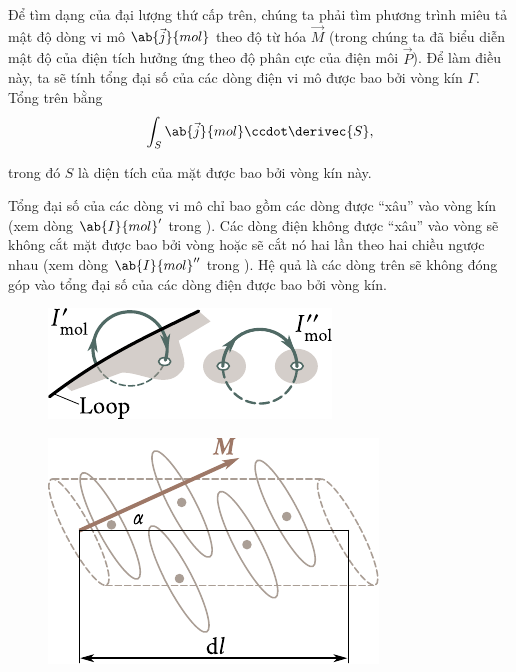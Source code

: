 Để tìm dạng của đại lượng thứ cấp trên, chúng ta phải tìm phương trình miêu tả mật độ dòng vi mô $\ab{\vec{j}}{mol}$ theo độ từ hóa $\vec{M}$ (trong  chúng ta đã biểu diễn mật độ của điện tích hưởng ứng theo độ phân cực của điện môi $\vec{P}$).
Để làm điều này, ta sẽ tính tổng đại số của các dòng điện vi mô được bao bởi vòng kín $\Gamma$. Tổng trên bằng
\begin{equation}\label{eq:7_5}
    \int_S \ab{\vec{j}}{mol} \ccdot \derivec{S},
\end{equation}

\noindent
trong đó  $S$ là diện tích của mặt được bao bởi vòng kín này.

Tổng đại số của các dòng vi mô chỉ bao gồm các dòng được ``xâu'' vào vòng kín (xem dòng $\ab{I}{mol}'$ trong ).
Các dòng điện không được ``xâu'' vào vòng sẽ không cắt mặt được bao bởi vòng hoặc sẽ cắt nó hai lần theo hai chiều ngược nhau (xem dòng $\ab{I}{mol}''$ trong ).
Hệ quả là các dòng trên sẽ không đóng góp vào tổng đại số của các dòng điện được bao bởi vòng kín.

\begin{figure}[!htb]
	\begin{minipage}[t]{0.48\linewidth}
		\begin{center}
			\includegraphics[scale=1]{figures/ch_07/fig_7_1.pdf}
			\caption[]{}
			\label{fig:7_1}
		\end{center}
	\end{minipage}
	\hfill{ }%
	\begin{minipage}[t]{0.48\linewidth}
		\begin{center}
			\includegraphics[scale=1]{figures/ch_07/fig_7_2.pdf}
			\caption[]{}
			\label{fig:7_2}
		\end{center}
	\end{minipage}
\vspace{-0.4cm}
\end{figure}

